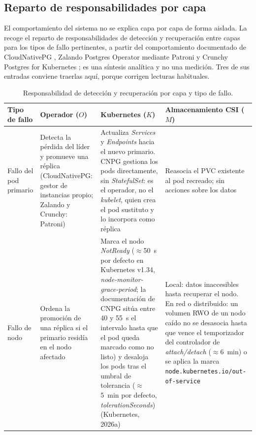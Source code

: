 \subsection{Reparto de responsabilidades por capa}\label{sec:reparto}
El comportamiento del sistema no se explica capa por capa de forma aislada. La  recoge el reparto de responsabilidades de detección y recuperación entre capas para los tipos de fallo pertinentes, a partir del comportamiento documentado de CloudNativePG \citep{cnpg2026}, Zalando Postgres Operator mediante Patroni \citep{patroni2026} y Crunchy Postgres for Kubernetes \citep{crunchy2026}; es una síntesis analítica y no una medición. Tres de sus entradas conviene traerlas aquí, porque corrigen lecturas habituales.

\begin{table}[t]
\centering
\footnotesize
\renewcommand{\arraystretch}{1.25}
\caption{Responsabilidad de detección y recuperación por capa y tipo de fallo.}
\label{tab:responsabilidad}
\begin{tabularx}{\linewidth}{@{}>{\raggedright\arraybackslash}p{2.4cm} >{\raggedright\arraybackslash}X >{\raggedright\arraybackslash}X >{\raggedright\arraybackslash}X@{}}
\toprule
\textbf{Tipo de fallo} & \textbf{Operador ($O$)} & \textbf{Kubernetes ($K$)} & \textbf{Almacenamiento CSI ($M$)} \\
\midrule
Fallo del pod primario &
Detecta la pérdida del líder y promueve una réplica (CloudNativePG: gestor de instancias propio; Zalando y Crunchy: Patroni) &
Actualiza \textit{Services} y \textit{Endpoints} hacia el nuevo primario. CNPG gestiona los pods directamente, sin \textit{StatefulSet}: es el operador, no el \textit{kubelet}, quien crea el pod sustituto y lo incorpora como réplica &
Reasocia el PVC existente al pod recreado; sin acciones sobre los datos \\
Fallo de nodo &
Ordena la promoción de una réplica si el primario residía en el nodo afectado &
Marca el nodo \textit{NotReady} ($\approx$50~s por defecto en Kubernetes v1.34, \textit{node-monitor-grace-period}; la documentación de CNPG sitúa entre 40 y 55~s el intervalo hasta que el pod queda marcado como no listo) y desaloja los pods tras el umbral de tolerancia ($\approx$5~min por defecto, \textit{tolerationSeconds}) (Kubernetes, 2026a) &
Local: datos inaccesibles hasta recuperar el nodo. En red o distribuido: un volumen RWO de un nodo caído no se desasocia hasta que vence el temporizador del controlador de \textit{attach/detach} ($\approx$6~min) o se aplica la marca \texttt{node.kubernetes.io/\allowbreak out-of-\allowbreak service} \\

\end{tabularx}
\end{table}
